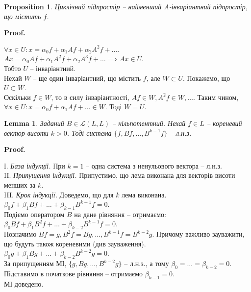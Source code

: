 \documentclass[a4paper, 10pt]{article}
\makeatletter
\theoremstyle{theoremdd}
\newtheorem{proposition}[theorem]{Proposition}
\newtheorem{lemma}[theorem]{Lemma}
\renewenvironment{proof}[1][Proof.\\]{\par
\pushQED{\hfill \qed}%
\normalfont \topsep6\p@\@plus6\p@\relax
\trivlist
\item\relax
{\bfseries
#1\@addpunct{.}}\hspace\labelsep\ignorespaces
}{%
\popQED\endtrivlist\@endpefalse
}
\makeatother
\begin{document}
\begin{proposition}
Циклічний підпростір -- найменший $A$-інваріантний підпростір, що містить $f$.
\end{proposition}

\begin{proof}
$\forall x \in U: x = \alpha_0 f + \alpha_1 Af + \alpha_2 A^2 f + \dots$.\\
$Ax = \alpha_0 Af + \alpha_1 A^2f + \alpha_2 A^3 f + \dots \implies Ax \in U$.\\
Тобто $U$ -- інваріантний.\\
Нехай $W$ -- ще один інваріантний, що містить $f$, але $W \subset U$. Покажемо, що $U \subset W$.\\
Оскільки $f \in W$, то в силу інваріантності, $Af \in W, A^2f \in W, \dots$. Таким чином,\\
$\forall x \in U: x = \alpha_0 f + \alpha_1 Af + \dots \in W$. Тоді $W = U$.
\end{proof}

\begin{lemma}
Заданий $B \in \mathcal{L}(L,L)$ -- нільпотентний. Нехай $f \in L$ -- кореневий вектор висоти $k>0$. Тоді система $\{f,Bf,\dots,B^{k-1}f\}$ -- л.н.з.
\end{lemma}

\begin{proof}
І. \textit{База індукції.} При $k = 1$ -- одна система з ненульового вектора -- л.н.з.\\
II. \textit{Припущення індукції.} Припустимо, що лема виконана для векторів висоти менших за $k$. \\
III. \textit{Крок індукції.} Доведемо, що для $k$ лема виконана.\\
$\beta_0 f + \beta_1 Bf + \dots + \beta_{k-1}B^{k-1}f = 0$.\\
Подіємо оператором $B$ на дане рівняння -- отримаємо:\\
$\beta_0 Bf + \beta_1 B^2f + \dots + \beta_{k-2}B^{k-1}f = 0$.\\
Позначимо $Bf = g, B^2f = Bg, \dots, B^{k-1}f = B^{k-2}g$. Причому важливо зауважити, що будуть також кореневими (див зауваження).\\
$\beta_0 g + \beta_1 Bg + \dots + \beta_{k-2} B^{k-2}g = 0$.\\
За припущенням МІ, $\{g,Bg,\dots,B^{k-2}g\}$ -- л.н.з., а тому $\beta_0 = \dots = \beta_{k-2} = 0$.\\
Підставимо в початкове рівняння -- отримаємо $\beta_{k-1} = 0$.\\
МІ доведено.
\end{proof}
\end{document}

